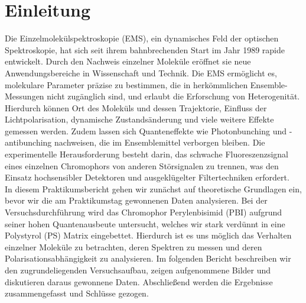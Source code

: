 \section{\label{sec:einleitung}Einleitung}
Die Einzelmolekülspektroskopie (EMS), ein dynamisches Feld der optischen Spektroskopie, 
hat sich seit ihrem bahnbrechenden Start im Jahr 1989 rapide entwickelt. 
Durch den Nachweis einzelner Moleküle eröffnet sie neue Anwendungsbereiche 
in Wissenschaft und Technik. 
Die EMS ermöglicht es, molekulare Parameter präzise zu bestimmen, die in herkömmlichen 
Ensemble-Messungen nicht zugänglich sind, und erlaubt die Erforschung von Heterogenität.
Hierdurch können Ort des Moleküls und dessen 
Trajektorie, Einfluss der Lichtpolarisation, dynamische Zustandsänderung 
und viele weitere Effekte gemessen werden. Zudem lassen sich Quanteneffekte 
wie Photonbunching und -antibunching nachweisen, die im Ensemblemittel verborgen bleiben.
Die experimentelle Herausforderung besteht darin, das schwache Fluoreszenzsignal eines einzelnen 
Chromophors von anderen Störsignalen zu trennen, was den Einsatz hochsensibler Detektoren und 
ausgeklügelter Filtertechniken erfordert. \\
In diesem Praktikumsbericht gehen wir zunächst auf theoretische Grundlagen ein, bevor wir die 
am Praktikumstag gewonnenen Daten analysieren. 
Bei der Versuchsdurchführung wird das Chromophor Perylenbisimid (PBI) aufgrund seiner hohen 
Quantenausbeute untersucht, welches wir stark verdünnt in eine Polystyrol (PS) Matrix eingebettet. 
Hierdurch ist es uns möglich das Verhalten einzelner Moleküle zu betrachten, deren Spektren zu 
messen und deren Polarisationsabhängigkeit zu analysieren. 
Im folgenden Bericht beschreiben wir den zugrundeliegenden Versuchsaufbau, zeigen aufgenommene 
Bilder und diskutieren daraus gewonnene Daten. Abschließend werden die Ergebnisse zusammengefasst
und Schlüsse gezogen.  
